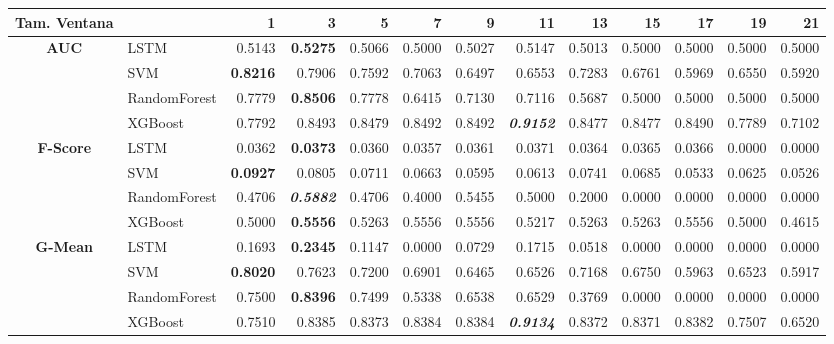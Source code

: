 \begin{table}[H]
	\centering
	\begin{adjustbox}{max width=12cm}
		\begin{tabular}{|c|l|r|r|r|r|r|r|r|r|r|r|r|}
			\hline
			\textbf{Tam. Ventana} &         &      1  &      3  &      5  &      7  &      9  &      11 &      13 &      15 &      17 &      19 &      21 \\
			\hline
			\textbf{AUC} &  LSTM &  0.5143 & \textbf{  0.5275 } &  0.5066 &  0.5000 &  0.5027 &  0.5147 &  0.5013 &  0.5000 &  0.5000 &  0.5000 &  0.5000 \\
			&  SVM & \textbf{  0.8216 } &  0.7906 &  0.7592 &  0.7063 &  0.6497 &  0.6553 &  0.7283 &  0.6761 &  0.5969 &  0.6550 &  0.5920 \\
			&  RandomForest &  0.7779 & \textbf{  0.8506 } &  0.7778 &  0.6415 &  0.7130 &  0.7116 &  0.5687 &  0.5000 &  0.5000 &  0.5000 &  0.5000 \\
			&  XGBoost &  0.7792 &  0.8493 &  0.8479 &  0.8492 &  0.8492 & \textit{ \textbf{  0.9152 } } &  0.8477 &  0.8477 &  0.8490 &  0.7789 &  0.7102 \\
			\hline
			\textbf{F-Score} &  LSTM &  0.0362 & \textbf{  0.0373 } &  0.0360 &  0.0357 &  0.0361 &  0.0371 &  0.0364 &  0.0365 &  0.0366 &  0.0000 &  0.0000 \\
			&  SVM & \textbf{  0.0927 } &  0.0805 &  0.0711 &  0.0663 &  0.0595 &  0.0613 &  0.0741 &  0.0685 &  0.0533 &  0.0625 &  0.0526 \\
			&  RandomForest &  0.4706 & \textit{ \textbf{  0.5882 } } &  0.4706 &  0.4000 &  0.5455 &  0.5000 &  0.2000 &  0.0000 &  0.0000 &  0.0000 &  0.0000 \\
			&  XGBoost &  0.5000 & \textbf{  0.5556 } &  0.5263 &  0.5556 &  0.5556 &  0.5217 &  0.5263 &  0.5263 &  0.5556 &  0.5000 &  0.4615 \\
			\hline
			\textbf{G-Mean} &  LSTM &  0.1693 & \textbf{  0.2345 } &  0.1147 &  0.0000 &  0.0729 &  0.1715 &  0.0518 &  0.0000 &  0.0000 &  0.0000 &  0.0000 \\
			&  SVM & \textbf{  0.8020 } &  0.7623 &  0.7200 &  0.6901 &  0.6465 &  0.6526 &  0.7168 &  0.6750 &  0.5963 &  0.6523 &  0.5917 \\
			&  RandomForest &  0.7500 & \textbf{  0.8396 } &  0.7499 &  0.5338 &  0.6538 &  0.6529 &  0.3769 &  0.0000 &  0.0000 &  0.0000 &  0.0000 \\
			&  XGBoost &  0.7510 &  0.8385 &  0.8373 &  0.8384 &  0.8384 & \textit{ \textbf{  0.9134 } } &  0.8372 &  0.8371 &  0.8382 &  0.7507 &  0.6520 \\

\end{tabular}
\end{adjustbox}
\end{table}
